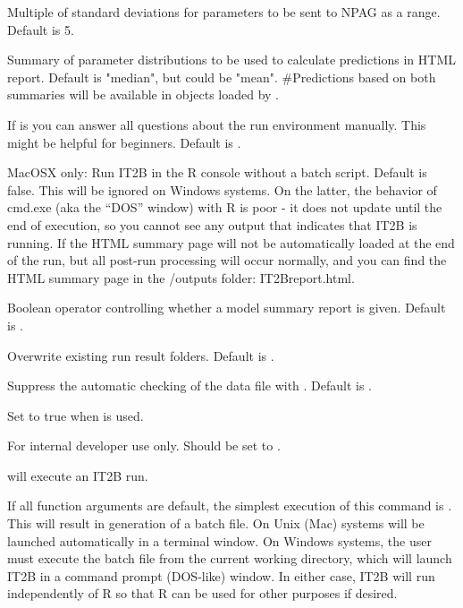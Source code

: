 \documentclass[a4paper]{book}
\begin{document}
\begin{Arguments}
\begin{ldescription}
\item[\code{xdev}] Multiple of standard deviations for parameters to be sent to NPAG as a range.  Default is 5.

\item[\code{icen}] Summary of parameter distributions to be used to calculate predictions in HTML report.  Default is "median", but could be "mean".
\#Predictions based on both summaries will be available in objects loaded by .

\item[\code{auto}] If  is  you can answer all questions about the run environment manually.  This might
be helpful for beginners.  Default is .

\item[\code{intern}] MacOSX only: Run IT2B in the R console without a batch script.  Default is false.
This will be ignored on Windows systems.  On the latter, the behavior of cmd.exe (aka the ``DOS'' window)
with R is poor - it does not update until the end of execution, so you cannot see any output that indicates that IT2B is running.  
If  the HTML summary page will not be automatically loaded at the end of the run, but all post-run processing will occur normally,
and you can find the HTML summary page in the /outputs folder: IT2Breport.html.

\item[\code{silent}] Boolean operator controlling whether a model summary report is given.  Default is .

\item[\code{overwrite}] Overwrite existing run result folders.  Default is .

\item[\code{nocheck}] Suppress the automatic checking of the data file with .  Default is .

\item[\code{batch}] Set to true when  is used.

\item[\code{alq}] For internal developer use only.  Should be set to .
\end{ldescription}
\end{Arguments}
%
\begin{Details}\relax
{} will execute an IT2B run.

If all function arguments are default, the simplest execution of this command is 
.  This will result in generation of a batch file.  On Unix (Mac) systems
will be launched automatically in a terminal window.  On Windows systems, the user
must execute the batch file from the current working directory, which will launch IT2B
in a command prompt (DOS-like) window.  In either case, IT2B will run independently of R
so that R can be used for other purposes if desired.
\end{Details}
\end{document}
